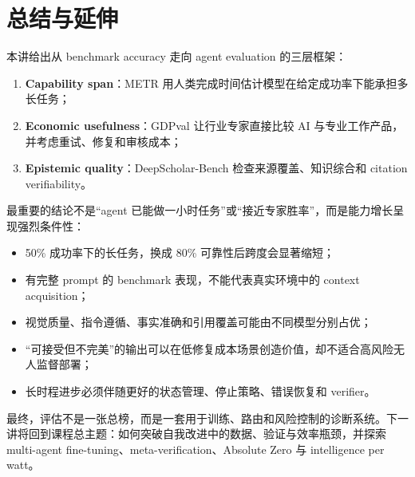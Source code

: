 \section{总结与延伸}

本讲给出从 benchmark accuracy 走向 agent evaluation 的三层框架：

\begin{enumerate}
    \item \textbf{Capability span}：METR 用人类完成时间估计模型在给定成功率下能承担多长任务；
    \item \textbf{Economic usefulness}：GDPval 让行业专家直接比较 AI 与专业工作产品，并考虑重试、修复和审核成本；
    \item \textbf{Epistemic quality}：DeepScholar-Bench 检查来源覆盖、知识综合和 citation verifiability。
\end{enumerate}

最重要的结论不是“agent 已能做一小时任务”或“接近专家胜率”，而是能力增长呈现强烈条件性：

\begin{itemize}
    \item 50\% 成功率下的长任务，换成 80\% 可靠性后跨度会显著缩短；
    \item 有完整 prompt 的 benchmark 表现，不能代表真实环境中的 context acquisition；
    \item 视觉质量、指令遵循、事实准确和引用覆盖可能由不同模型分别占优；
    \item “可接受但不完美”的输出可以在低修复成本场景创造价值，却不适合高风险无人监督部署；
    \item 长时程进步必须伴随更好的状态管理、停止策略、错误恢复和 verifier。
\end{itemize}

最终，评估不是一张总榜，而是一套用于训练、路由和风险控制的诊断系统。下一讲将回到课程总主题：如何突破自我改进中的数据、验证与效率瓶颈，并探索 multi-agent fine-tuning、meta-verification、Absolute Zero 与 intelligence per watt。


